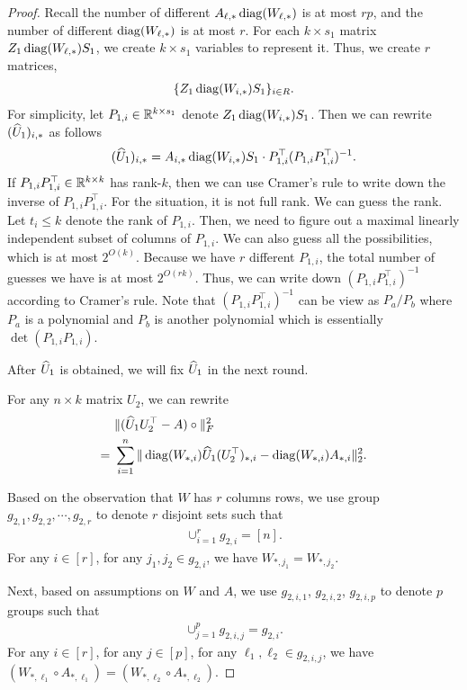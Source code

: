 \begin{proof}
Recall the number of different $A_{\ell,*} \operatorname{diag}(W_{\ell,*})$ is at most $rp$, and the number of different $ \operatorname{diag}(W_{\ell,*})$ is at most $r$. For each $k \times s_1$ matrix $Z_1 \operatorname{diag}( W_{\ell,*}) S_1$, we create $k \times s_1$ variables to represent it. Thus, we create $r$ matrices,
\begin{align*}
\{ Z_1 \operatorname{diag}( W_{i,*} ) S_1 \}_{i \in R}. 
\end{align*}
For simplicity, let $P_{1,i} \in \mathbb{R}^{k \times s_1}$ denote $Z_1 \operatorname{diag}(W_{i,*}) S_1$. Then we can rewrite $(\widehat{U}_1)_{i,*}$ as follows
\begin{align*}
    (\widehat{U}_1)_{i,*} = A_{i,*} \operatorname{diag}(W_{i,*}) S_1  \cdot P_{1,i}^\top (P_{1,i} P_{1,i}^\top )^{-1}.
\end{align*}
If $P_{1,i} P_{1,i}^\top \in \mathbb{R}^{k \times k}$ has rank-$k$, then we can use Cramer's rule to write down the inverse of $P_{1,i} P_{1,i}^\top$.
For the situation, it is not full rank. We can guess the rank. Let $t_i \leq k$ denote the rank of $P_{1,i}$. Then, we need to figure out a maximal linearly independent subset of columns of $P_{1,i}$. We can also guess all the possibilities, which is at most $2^{O(k)}$. Because we have $r$ different $P_{1,i}$, the total number of guesses we have is at most $2^{O(rk)}$. Thus, we can write down $(P_{1,i} P_{1,i}^\top)^{-1}$ according to Cramer's rule. Note that $(P_{1,i} P_{1,i}^\top)^{-1}$ can be view as $P_a/P_b$ where $P_a$ is a polynomial and $P_b$ is another polynomial which is essentially $\det(P_{1,i} P_{1,i})$.


After $\widehat{U}_1$ is obtained, we will fix $\widehat{U}_1$ in the next round.

For any $n \times k$ matrix $U_2$, we can rewrite 
\begin{align*}
 & ~ \| (\widehat{U}_1 U_2^\top  - A ) \circ \|_F^2 \\
 = & ~ \sum_{i=1}^n \| \operatorname{diag}(  W_{*,i} ) \widehat{U}_1   (U_2^\top)_{*,i}   - \operatorname{diag}(W_{*,i}) A_{*,i} \|_2^2 .
\end{align*}



Based on the observation that $W$ has $r$ columns rows, we use group $g_{2,1}, g_{2,2}, \cdots , g_{2,r}$ to denote $r$ disjoint sets such that
\begin{align*}
    \cup_{i=1}^r g_{2,i} = [n].
\end{align*}
For any $i \in [r]$, for any $j_1, j_2 \in g_{2,i}$, we have $W_{*,j_1} = W_{*,j_2}$.

Next, based on assumptions on $W$ and $A$, we use $g_{2,i,1}$, $g_{2,i,2}$, $g_{2,i,p}$ to denote $p$ groups such that 
\begin{align*}
    \cup_{j=1}^p g_{2,i,j} = g_{2,i}.
\end{align*}
For any $i \in [r]$, for any $j \in [p]$, for any $\ell_1, \ell_2 \in g_{2,i,j}$, we have  $(W_{*,\ell_1} \circ A_{*,\ell_1}) = (W_{*,\ell_2} \circ A_{*,\ell_2})$.


\end{proof}
